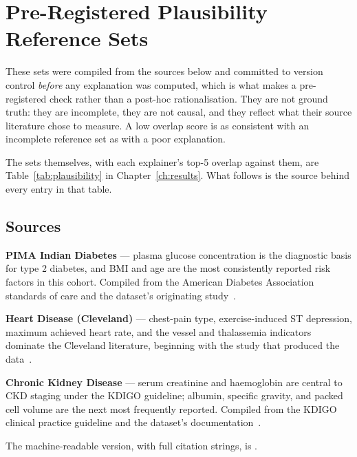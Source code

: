 \chapter{Pre-Registered Plausibility Reference Sets}\label{app:refsets}

These sets were compiled from the sources below and committed to version control
\emph{before} any explanation was computed, which is what makes  a pre-registered
check rather than a post-hoc rationalisation. They are not ground truth: they are
incomplete, they are not causal, and they reflect what their source literature chose to
measure. A low overlap score is as consistent with an incomplete reference set as with a
poor explanation.

The sets themselves, with each explainer's top-5 overlap against them, are
Table~\ref{tab:plausibility} in Chapter~\ref{ch:results}. What follows is the source
behind every entry in that table.

\section{Sources}
\textbf{PIMA Indian Diabetes} --- plasma glucose concentration is the diagnostic basis
for type 2 diabetes, and BMI and age are the most consistently reported risk factors in
this cohort. Compiled from the American Diabetes Association standards of care and the
dataset's originating study~\cite{smith1988using}.

\textbf{Heart Disease (Cleveland)} --- chest-pain type, exercise-induced ST depression,
maximum achieved heart rate, and the vessel and thalassemia indicators dominate the
Cleveland literature, beginning with the study that produced the
data~\cite{detrano1989international}.

\textbf{Chronic Kidney Disease} --- serum creatinine and haemoglobin are central to CKD
staging under the KDIGO guideline; albumin, specific gravity, and packed cell volume are
the next most frequently reported. Compiled from the KDIGO clinical practice guideline
and the dataset's documentation~\cite{rubini2015ckd}.

The machine-readable version, with full citation strings, is
.
